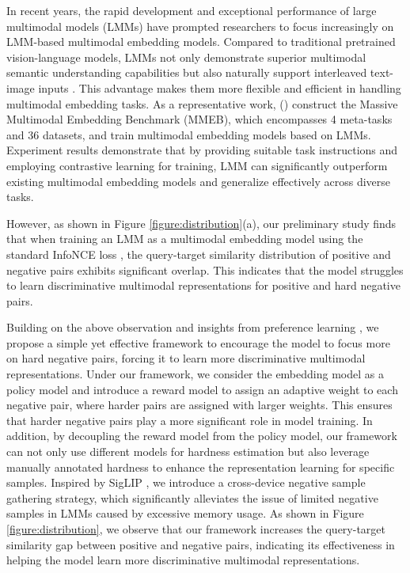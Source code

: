 \documentclass[11pt]{article}
\begin{document}
In recent years, the rapid development and exceptional performance of large multimodal models (LMMs) have prompted researchers to focus increasingly on LMM-based multimodal embedding models. Compared to traditional pretrained vision-language models, LMMs not only demonstrate superior multimodal semantic understanding capabilities but also naturally support interleaved text-image inputs \cite{gpt-4v,LLaVA,LLaVA1.5,lan-etal-2025-avg,DBLP:journals/corr/abs-2508-04453}. This advantage makes them more flexible and efficient in handling multimodal embedding tasks. As a representative work, \citeauthor{VLM2Vec} (\citeyear{VLM2Vec}) construct the Massive Multimodal Embedding Benchmark (MMEB), which encompasses 4 meta-tasks and 36 datasets, and train multimodal embedding models based on LMMs. Experiment results demonstrate that by providing suitable task instructions and employing contrastive learning for training, LMM can significantly outperform existing multimodal embedding models and generalize effectively across diverse tasks. 

However, as shown in Figure \ref{figure:distribution}(a), our preliminary study finds that when training an LMM as a multimodal embedding model using the standard InfoNCE loss \cite{InfoNCE}, the query-target similarity distribution of positive and negative pairs exhibits significant overlap. This indicates that the model struggles to learn discriminative multimodal representations for positive and hard negative pairs.

Building on the above observation and insights from preference learning \cite{DPO, DBLP:conf/aaai/00010LYHLW24}, we propose a simple yet effective framework to encourage the model to focus more on hard negative pairs, forcing it to learn more discriminative multimodal representations. Under our framework, we consider the embedding model as a policy model and introduce a reward model to assign an adaptive weight to each negative pair, where harder pairs are assigned with larger weights. This ensures that harder negative pairs play a more significant role in model training. In addition, by decoupling the reward model from the policy model, our framework can not only use different models for hardness estimation but also leverage manually annotated hardness to enhance the representation learning for specific samples. Inspired by SigLIP \cite{SigLIP}, we introduce a cross-device negative sample gathering strategy, which significantly alleviates the issue of limited negative samples in LMMs caused by excessive memory usage. As shown in Figure \ref{figure:distribution}, we observe that our framework increases the query-target similarity gap between positive and negative pairs, indicating its effectiveness in helping the model learn more discriminative multimodal representations.
\end{document}
